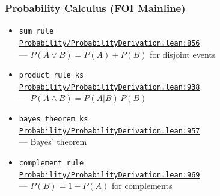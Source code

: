\documentclass[11pt]{article}
\theoremstyle{definition}
\theoremstyle{remark}
\begin{document}
\subsubsection*{Probability Calculus (FOI Mainline)}
\begin{itemize}
\item \texttt{sum\_rule}\\
      \href{https://github.com/zariuq/ks-foundations-of-inference/blob/main/KnuthSkilling/Probability/ProbabilityDerivation.lean\#L856}{\texttt{Probability/ProbabilityDerivation.lean:856}}\\
      --- $P(A \vee B) = P(A) + P(B)$ for disjoint events
\item \texttt{product\_rule\_ks}\\
      \href{https://github.com/zariuq/ks-foundations-of-inference/blob/main/KnuthSkilling/Probability/ProbabilityDerivation.lean\#L938}{\texttt{Probability/ProbabilityDerivation.lean:938}}\\
      --- $P(A \wedge B) = P(A|B)\,P(B)$
\item \texttt{bayes\_theorem\_ks}\\
      \href{https://github.com/zariuq/ks-foundations-of-inference/blob/main/KnuthSkilling/Probability/ProbabilityDerivation.lean\#L957}{\texttt{Probability/ProbabilityDerivation.lean:957}}\\
      --- Bayes' theorem
\item \texttt{complement\_rule}\\
      \href{https://github.com/zariuq/ks-foundations-of-inference/blob/main/KnuthSkilling/Probability/ProbabilityDerivation.lean\#L969}{\texttt{Probability/ProbabilityDerivation.lean:969}}\\
      --- $P(B)=1-P(A)$ for complements
\end{itemize}
\end{document}
